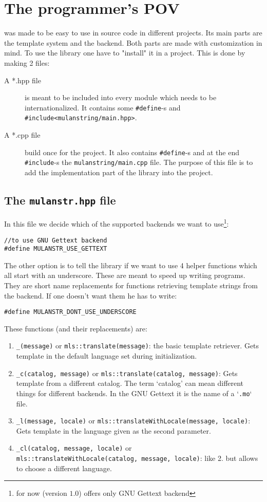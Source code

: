 \section{The programmer's POV}

\mulan{} was made to be easy to use in source code in different projects. Its main parts are the template system and the backend. 
Both parts are made with customization in mind. To use the library one have to "install" it in a project. This is done by making 2 files:
\begin{description}
	\item[A *.hpp file] is meant to be included into every module which needs to be internationalized. 
	It contains some \verb+#define+-s and \verb+#include<mulanstring/main.hpp>+.
	\item[A *.cpp file] build once for the project. It also contains \verb+#define+-s and at the end \verb+#include+-s the \verb+mulanstring/main.cpp+ file. 
	The purpose of this file is to add the implementation part of the \mulan{} library into the project.
\end{description}

\subsection{The \texttt{mulanstr.hpp} file}\label{headerFile}
In this file we decide which of the supported backends we want to use\footnote{for now (version $1.0$) \mulan{} offers only GNU Gettext backend}:
\begin{verbatim}
//to use GNU Gettext backend
#define MULANSTR_USE_GETTEXT
\end{verbatim}

The other option is to tell the library if we want to use 4 helper functions which all start with an underscore.
These are meant to speed up writing programs. They are short name replacements for functions retrieving template strings from the backend.
If one doesn't want them he has to write:
\begin{verbatim}
#define MULANSTR_DONT_USE_UNDERSCORE
\end{verbatim}

These functions (and their replacements) are:
\begin{enumerate}
	\item \texttt{\_(message)} or \texttt{mls::translate(message)}: the basic template retriever. Gets template in the default language set during initialization.
	\item \texttt{\_c(catalog, message)} or \texttt{mls::translate(catalog, message)}: Gets template from a different catalog. 
	The term `catalog' can mean different things for different backends. In the GNU Gettext it is the name of a `\texttt{.mo}` file.
	\item \texttt{\_l(message, locale)} or \texttt{mls::translateWithLocale(message, locale)}: Gets template in the language given as the second parameter. 
	\item \texttt{\_cl(catalog, message, locale)} or\\ \texttt{mls::translateWithLocale(}\texttt{catalog, message, locale)}: like 2. but allows to choose a different language.
\end{enumerate}

